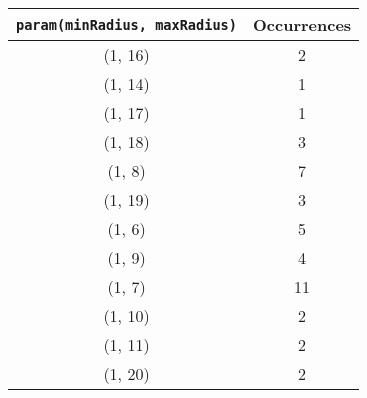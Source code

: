 \documentclass[letterpaper, 12pt]{article}
\begin{document}
\begin{longtable}{|c|c|}
\hline
\textbf{\texttt{param(minRadius, maxRadius)}} & \textbf{Occurrences} \\
\hline
(1, 16) & 2 \\
\hline
(1, 14) & 1 \\
\hline
(1, 17) & 1 \\
\hline
(1, 18) & 3 \\
\hline
(1, 8) & 7 \\
\hline
(1, 19) & 3 \\
\hline
(1, 6) & 5 \\
\hline
(1, 9) & 4 \\
\hline
(1, 7) & 11 \\
\hline
(1, 10) & 2 \\
\hline
(1, 11) & 2 \\
\hline
(1, 20) & 2 \\
\hline
\end{longtable}
\end{document}
